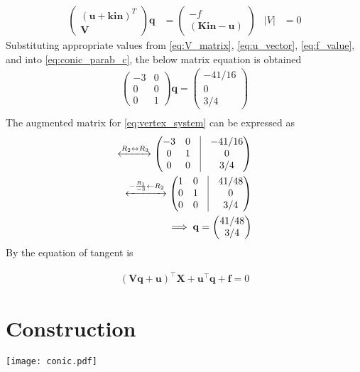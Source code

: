 \documentclass[journal,10pt,twocolumn]{article}
\providecommand{\abs}[1]{\left\vert#1\right\vert}
\let\vec\mathbf
\newcommand{\myvec}[1]{\ensuremath{\begin{pmatrix}#1\end{pmatrix}}}
\begin{document}
\begin{align}
    \myvec{( \vec{u}+\vec{ki}\vec{n})^T\\ \vec{V}}\vec{q} &= \myvec{-f \\ (\vec{Ki}\vec{n}-\vec{u})}  &\abs{V} &= 0
    \label{eq:conic_parab_c}
    \end{align}
Substituting appropriate values from \eqref{eq:V_matrix}, \eqref{eq:u_vector}, \eqref{eq:f_value}, and into \eqref{eq:conic_parab_c}, the below matrix equation is obtained
\begin{align}
	\label{eq:vertex_system}
	\myvec{-3&0\\0& 0\\0& 1}\vec{q} = \myvec{-41/16\\0 \\3/4}\\
\end{align}
The augmented matrix for \eqref{eq:vertex_system} can be expressed as
\begin{align}
	\xleftrightarrow[]{R_2 \leftrightarrow R_3}\myvec{-3&0&\vrule&-41/16\\0&1&\vrule&0\\0&0&\vrule&3/4}\\
	\label{eq:vertex_solv3}
	\xleftrightarrow[]{-\frac{R_1}{-3} \leftarrow R_2}\myvec{1&0&\vrule&41/48\\0&1&\vrule&0\\0&0&\vrule&3/4}\\
	\label{eq:vertex_solv4}
	\implies\vec{q} = \myvec{41/48\\3/4}
\end{align}
By the equation of tangent is 
\begin{center}
\begin{align}
 \vec{(Vq+u)}^{\top}\vec{X}+\vec{u}^{\top}\vec{q}+\vec{f} =0 
\end{align}
\end{center}
\section{ Construction}
\texttt{[image: conic.pdf]} 
\end{document}

